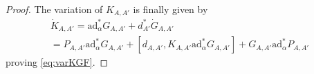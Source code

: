 \documentclass[11pt,a4paper]{amsart}
\theoremstyle{plain} %
\theoremstyle{definition}
\theoremstyle{remark}
\newcommand{\dd}{d}
\newcommand{\mr}{\mathrm}
\begin{document}
\begin{proof}
The variation of $K_{A,A'}$ is finally given by 
\begin{multline*}\dot{K}_{A,A'} = \mr{ad}^*_\alpha G_{A,A'} + \dd^*_{A'}\dot{G}_{A,A'} \\
= P_{A,A'} \mr{ad}^*_\alpha G_{A,A'} + \left[\dd_{A,A'},K_{A,A'}\mathrm{ad}^*_\alpha G_{A,A'}\right] + G_{A,A'}\mr{ad}^*_\alpha P_{A,A'} 
\end{multline*}
proving \eqref{eq:varKGF}.
\end{proof}
\end{document}
